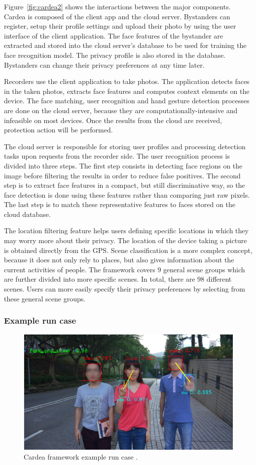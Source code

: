 \documentclass[conference, 11pt]{IEEEtran}
\begin{document}
Figure~\ref{fig:cardea2} shows the interactions between the major components. Cardea is composed of the client app and the cloud server. Bystanders can register, setup their profile settings and upload their photo by using the user interface of the client application. The face features of the bystander are extracted and stored into the cloud server's database to be used for training the face recognition model. The privacy profile is also stored in the database. Bystanders can change their privacy preferences at any time later. 

Recorders use the client application to take photos. The application detects faces in the taken photos, extracts face features and computes context elements on the device. The face matching, user recognition and hand gesture detection processes are done on the cloud server, because they are computationally-intensive and infeasible on most devices. Once the results from the cloud are received, protection action will be performed. 

The cloud server is responsible for storing user profiles and processing detection tasks upon requests from the recorder side. The user recognition process is divided into three steps. The first step consists in detecting face regions on the image before filtering the results in order to reduce false positives. The second step is to extract face features in a compact, but still discriminative way, so the face detection is done using these features rather than comparing just raw pixels. The last step is to match these representative features to faces stored on the cloud database. 

The location filtering feature helps users defining specific locations in which they may worry more about their privacy. The location of the device taking a picture is obtained directly from the \ac{GPS}. Scene classification is a more complex concept, because it does not only rely to places, but also gives information about the current activities of people. The framework covers 9 general scene groups which are further divided into more specific scenes. In total, there are 98 different scenes. Users can more easily specify their privacy preferences by selecting from these general scene groups. 


\subsubsection{Example run case}
\begin{figure}[t]
\centerline{\includegraphics[width=.5\textwidth]{img/cardea_example.png}}
\caption{Cardea framework example run case \cite{shu2016cardea}.}
\label{fig:cardea3}
\end{figure}
\end{document}
